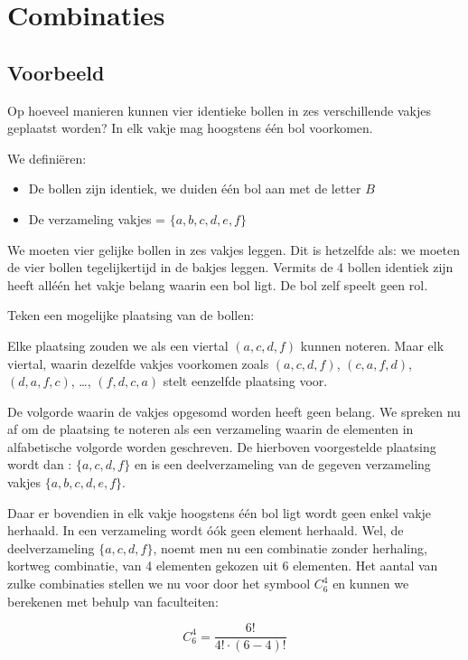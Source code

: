 \documentclass[12pt,twoside]{article}
\begin{document}
\pagebreak
\section{Combinaties}

\begin{cursus}
\subsection{Voorbeeld}

Op hoeveel manieren kunnen vier identieke bollen in zes verschillende vakjes geplaatst worden? In elk vakje mag hoogstens één bol voorkomen.

We definiëren:
\begin{itemize}
  \item De bollen zijn identiek, we duiden één bol aan met de letter $B$
  \item De verzameling vakjes = $\{a, b, c, d, e, f\}$
\end{itemize}

We moeten vier gelijke bollen in zes vakjes leggen. Dit is hetzelfde als: we moeten de vier bollen tegelijkertijd in de bakjes leggen. Vermits de 4 bollen identiek zijn heeft alléén het vakje belang waarin een bol ligt. De bol zelf speelt geen rol.

Teken een mogelijke plaatsing van de bollen:

Elke plaatsing zouden we als een viertal $(a, c, d, f)$ kunnen noteren. Maar elk viertal, waarin dezelfde vakjes voorkomen zoals $(a, c, d, f)$, $(c, a, f, d)$, $(d, a, f, c)$, \ldots, $(f, d, c, a)$ stelt eenzelfde plaatsing voor.

De volgorde waarin de vakjes opgesomd worden heeft geen belang. We spreken nu
af om de plaatsing te noteren als een verzameling waarin de elementen in
alfabetische volgorde worden geschreven. De hierboven voorgestelde plaatsing
wordt dan : $\{a, c, d, f\}$ en is een deelverzameling van de gegeven verzameling vakjes $\{a, b, c, d, e, f\}$.

Daar er bovendien in elk vakje hoogstens één bol ligt wordt geen enkel vakje
herhaald. In een verzameling wordt óók geen element herhaald. Wel, de
deelverzameling $\{a, c, d, f\}$, noemt men nu een combinatie zonder herhaling, kortweg combinatie, van 4 elementen gekozen uit 6 elementen.
Het aantal van zulke combinaties stellen we nu voor door het symbool $C^4_6$ en kunnen we berekenen met behulp van faculteiten:

$$C^4_6=\dfrac{6!}{4!\cdot (6-4)!}$$


\end{cursus}
\end{document}
